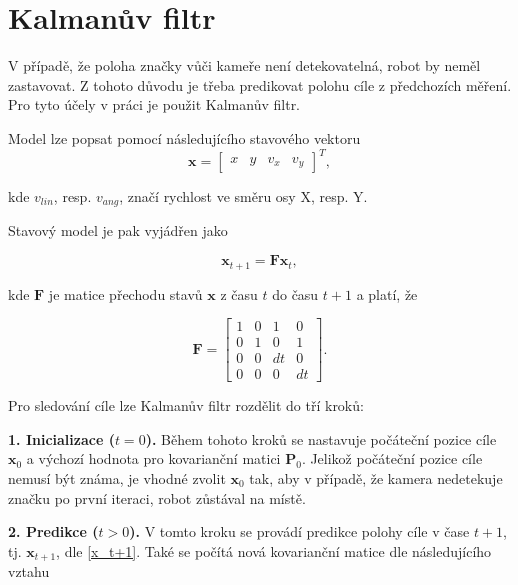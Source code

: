 \documentclass[twoside]{ctuthesis}
\theoremstyle{plain}
\theoremstyle{definition}
\theoremstyle{note}
\begin{document}
\section{Kalmanův filtr}
V případě, že poloha značky vůči kameře není detekovatelná, robot by neměl zastavovat. Z tohoto důvodu je třeba predikovat polohu cíle z předchozích měření. Pro tyto účely v práci je použit Kalmanův filtr. 

Model lze popsat pomocí následujícího stavového vektoru
\begin{equation}
{\boldsymbol{x}} = 
\begin{bmatrix}
x&y&v_{x}&v_{y}
\end{bmatrix}^T,
\end{equation}

kde $v_{lin}$, resp. $v_{ang}$, značí rychlost ve směru osy X, resp. Y.


Stavový model je pak vyjádřen jako

\begin{equation}
\label{x_t+1}
{\boldsymbol{x}}_{t+1} = \boldsymbol{F}{\boldsymbol{x}}_{t},
\end{equation}

kde $\boldsymbol{F}$ je matice přechodu stavů $\boldsymbol{x}$ z času $t$ do času $t + 1$ a platí, že

\begin{equation}
\boldsymbol{F} = \begin{bmatrix}
1&0&1&0\\
0&1&0&1\\
0&0&dt&0\\
0&0&0&dt
\end{bmatrix}.
\end{equation}

Pro sledování cíle lze Kalmanův filtr rozdělit do tří kroků:

\textbf{1.  Inicializace ($t = 0$).} Během tohoto kroků se nastavuje počáteční pozice cíle $\boldsymbol{x}_0$ a výchozí hodnota pro kovarianční matici $\boldsymbol{P}_0$. Jelikož počáteční pozice cíle nemusí být známa, je vhodné zvolit $\boldsymbol{x}_0$ tak, aby v případě, že kamera nedetekuje značku po první iteraci, robot zůstával na místě.

\textbf{2. Predikce ($t > 0$).} V tomto kroku se provádí predikce polohy cíle v čase $t + 1$, tj. $\boldsymbol{x}_{t+1}$, dle \ref{x_t+1}. Také se počítá nová kovarianční matice dle následujícího vztahu
\end{document}
